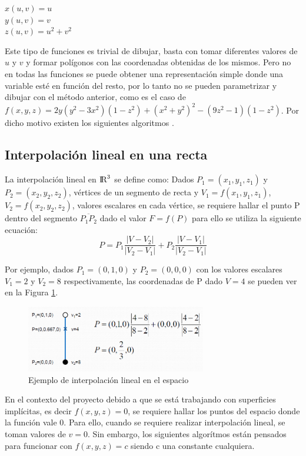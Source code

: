 \documentclass[12pt]{article}
\begin{document}
\begin{center}
$x(u,v) = u$\\
$y(u,v) = v$\\
$z(u,v) = u^2+v^2$\\
\end{center}

Este tipo de funciones es trivial de dibujar, basta con tomar diferentes valores de $u$ y $v$ y formar polígonos con las coordenadas obtenidas de los mismos.
Pero no en todas las funciones se puede obtener una representación simple donde una variable esté en función del resto, por lo tanto no se pueden parametrizar y dibujar con el método anterior, como es el caso de  $f(x,y,z) = 2y(y^2-3x^2)(1-z^2)+(x^2+y^2)^2-(9z^2-1)(1-z^2)$. Por dicho motivo existen los siguientes algoritmos \cite{implicitas}.
\subsection{Interpolación lineal en una recta}
\noindent  La interpolación lineal en ${\rm I\!R} ^3$ se define como: Dados $P_1=(x_1,y_1,z_1)$ y $P_2=(x_2,y_2,z_2)$, vértices de un segmento de recta y $V_1=f(x_1,y_1,z_1)$, $V_2=f(x_2,y_2,z_2)$, valores escalares en cada vértice, se requiere hallar el punto P dentro del segmento $\overline{P_1 P_2}$ dado el valor $F=f(P)$ para ello se utiliza la siguiente ecuación: 
$$P=P_1 \dfrac{\vert V-V_2\vert}{\vert V_2-V_1\vert}+P_2 \dfrac{\vert V-V_1\vert}{\vert V_2-V_1\vert}$$

Por ejemplo, dados $P_1=(0, 1, 0)$ y $P_2=(0, 0, 0)$ con los valores escalares $V_1=2$ y $V_2=8$ respectivamente, las coordenadas de P dado $V=4$ se pueden ver en la Figura \ref{interpolacionlineal}.
\begin{figure}[h!]
\includegraphics[width=0.7\textwidth,center]{interpolacion_ejemplo.png}
\caption{Ejemplo de interpolación lineal en el espacio}
\label{interpolacionlineal}
\end{figure}
En el contexto del proyecto debido a que se está trabajando con superficies implícitas, es decir $f(x,y,z)=0$, se requiere hallar los puntos del espacio donde la función vale 0. Para ello, cuando se requiere realizar interpolación lineal, se toman valores de $v=0$. Sin embargo, los siguientes algorítmos están pensados para funcionar con $f(x,y,z)=c$ siendo c una constante cualquiera.
\end{document}
